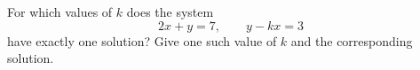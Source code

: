 For which values of $k$ does the system
\[
2x+y=7,\qquad y-kx=3
\]
have exactly one solution? Give one such value of $k$ and the corresponding solution.
